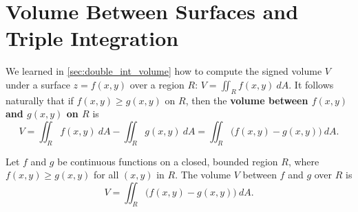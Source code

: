 \section{Volume Between Surfaces and Triple Integration}\label{sec:triple_int}

We learned in \autoref{sec:double_int_volume} how to compute the signed volume $V$ under a surface $z=f(x,y)$ over a region $R$: $V = \iint_R f(x,y)\ dA$. It follows naturally that if $f(x,y)\geq g(x,y)$ on $R$, then the \textbf{volume between $f(x,y)$ and $g(x,y)$ on $R$} is 
$$V = \iint_R f(x,y)\ dA - \iint_R g(x,y)\ dA = \iint_R \big(f(x,y)-g(x,y)\big)\ dA.$$

{Let $f$ and $g$ be continuous functions on a closed, bounded region $R$, where $f(x,y)\geq g(x,y)$ for all $(x,y)$ in $R$. The volume $V$ between $f$ and $g$ over $R$ is
$$V =\iint_R \big(f(x,y)-g(x,y)\big)\ dA.$$}

